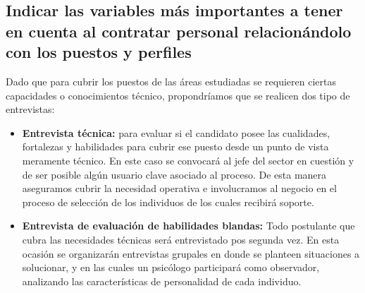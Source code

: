 \newpage

    \subsection{Indicar las variables más importantes a tener en cuenta al contratar personal relacionándolo con los puestos y perfiles}%
  
    
    Dado que para cubrir los puestos de las áreas estudiadas se requieren ciertas capacidades o conocimientos técnico, propondríamos que se realicen dos tipo de entrevistas:
    \begin{itemize}
	    \item \textbf{Entrevista técnica:} para evaluar si el candidato posee las cualidades, fortalezas y habilidades para cubrir ese puesto desde un punto de vista meramente técnico. En este caso se convocará al jefe del sector en cuestión y de ser posible algún usuario clave asociado al proceso. De esta manera aseguramos cubrir la necesidad operativa e involucramos al negocio en el proceso de selección de los individuos de los cuales recibirá soporte.
        \item \textbf{Entrevista de evaluación de habilidades blandas: } Todo postulante que cubra las necesidades técnicas será entrevistado pos segunda vez. En esta ocasión se organizarán entrevistas grupales en donde se planteen situaciones a solucionar, y en las cuales un psicólogo participará como observador, analizando las características de personalidad de cada individuo.
           \end{itemize}


